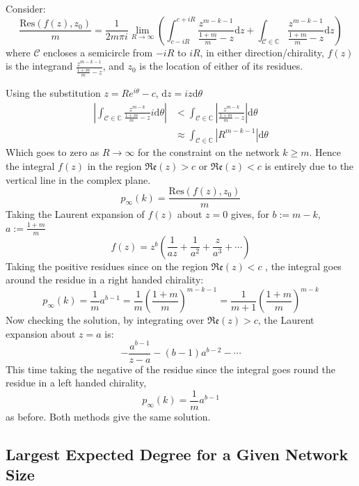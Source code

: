 \documentclass[twoside]{article}
\begin{document}
Consider:
\[
\frac{\mathrm{Res}(f(z),z_0)}{m}=\frac{1}{2m\pi i} \lim_{R \to \infty} \left( \int_{c-iR}^{c+iR}  \frac{z^{m-k-1}}{\frac{1+m}{m}-z} \mathrm{d} z  +  \int_{\mathcal{C}\in \mathbb{C}}  \frac{z^{m-k-1}}{\frac{1+m}{m}-z} \mathrm{d} z  \right)
\]
where $\mathcal{C}$ encloses a semicircle from $-iR$ to $iR$, in either direction/chirality, $f(z)$ is the integrand $\frac{z^{m-k-1}}{\frac{1+m}{m}-z} $, and $z_0$ is the location of either of its residues.

Using the substitution $z=R e^{i\theta} -c$, $\mathrm{d} z = iz \mathrm{d} \theta$
\begin{align*}
\left| \int_{\mathcal{C}\in \mathbb{C}}  \frac{z^{m-k}}{\frac{1+m}{m}-z}i \mathrm{d} \theta \right| &<  \int_{\mathcal{C}\in \mathbb{C}} \left| \frac{z^{m-k}}{\frac{1+m}{m}-z} \right| \mathrm{d} \theta \\
& \approx \int_{\mathcal{C}\in \mathbb{C}} \left| R^{m-k-1} \right| \mathrm{d} \theta 
\end{align*}
Which goes to zero as $R \to \infty$ for the constraint on the network $k \geq m $. Hence the integral $f(z)$ in the region $\mathfrak{Re}(z)>c$ or $\mathfrak{Re}(z)<c$ is entirely due to the vertical line in the complex plane.
\[
p_{\infty} (k)=\frac{\mathrm{Res}(f(z),z_0)}{m}
\]
Taking the Laurent expansion of $f(z)$ about $z=0$ gives, for $b:=m-k$, $a:=\frac{1+m}{m}$
\[
f(z)= z^b \left( \frac{1}{az} + \frac{1}{a^2} + \frac{z}{a^3} + \cdots \right)
\]
Taking the positive residues since on the region $\mathfrak{Re}(z)<c$ , the integral goes around the residue in a right handed chirality:
\[
\boxed{
p_{\infty} (k) = \frac{1}{m} a^{b-1} = \frac{1}{m} \left( \frac{1+m}{m} \right)^{m-k-1} = \frac{1}{m+1}  \left( \frac{1+m}{m} \right)^{m-k}}
\]
Now checking the solution, by integrating over  $\mathfrak{Re}(z)>c$, the Laurent expansion about $z=a$ is:
\[
-\frac{a^{b-1}}{z-a} - (b-1) a^{b-2} - \cdots
\]
This time taking the negative of the residue since the integral goes round the residue in a left handed chirality,
\[
p_{\infty}(k) = \frac{1}{m} a^{b-1}
\]
as before. Both methods give the same solution.

\subsection{Largest Expected Degree for a Given Network Size}
\end{document}
